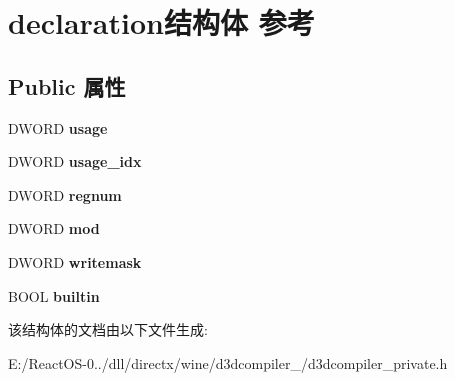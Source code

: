 \hypertarget{structdeclaration}{}\section{declaration结构体 参考}
\label{structdeclaration}
\subsection*{Public 属性}
\begin{DoxyCompactItemize}
\item 
\mbox{\label{structdeclaration_ade14f0e9e01d2a3beb45353a0b559bdc}} 
D\+W\+O\+RD {\bfseries usage}
\item 
\mbox{\label{structdeclaration_a70f2d6a457e66b2e2e2d19585c34a1b9}} 
D\+W\+O\+RD {\bfseries usage\+\_\+idx}
\item 
\mbox{\label{structdeclaration_af97b4756094450b36eb8d6b68b024c91}} 
D\+W\+O\+RD {\bfseries regnum}
\item 
\mbox{\label{structdeclaration_a5b120cd88bac8fd55e31eeeb5d154e71}} 
D\+W\+O\+RD {\bfseries mod}
\item 
\mbox{\label{structdeclaration_aa60c5f522cb95dc61f3de70d44282bb2}} 
D\+W\+O\+RD {\bfseries writemask}
\item 
\mbox{\label{structdeclaration_aa633c53e482baaeb722ebb78bf0de1cf}} 
B\+O\+OL {\bfseries builtin}
\end{DoxyCompactItemize}


该结构体的文档由以下文件生成\+:\begin{DoxyCompactItemize}
\item 
E\+:/\+React\+O\+S-\/0../dll/directx/wine/d3dcompiler\+\_/d3dcompiler\+\_\+private.\+h\end{DoxyCompactItemize}
